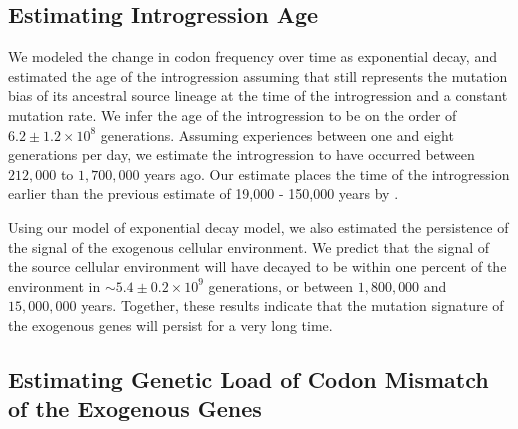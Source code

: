 \documentclass[fleqn,letterpaper]{article}
\begin{document}
\subsection*{Estimating Introgression Age}

We modeled the change in codon frequency over time as exponential decay, and estimated the age of the introgression assuming that \gossypii still represents the mutation bias of its ancestral source lineage at the time of the introgression and a constant mutation rate.
We infer the age of the introgression to be on the order of $6.2\pm1.2\times 10^8$ generations. 
Assuming \kluyveri experiences between one and eight generations per day, we estimate the introgression to have occurred between $212,000$ to $1,700,000$ years ago.
Our estimate places the time of the introgression earlier than the previous estimate of 19,000 - 150,000 years by \citet{friedrich2015}.

Using our model of exponential decay model, we also estimated the persistence of the signal of the exogenous cellular environment.
We predict that the \DM signal of the source cellular environment will have decayed to be within one percent of the \kluyveri environment in $\sim 5.4\pm0.2\times 10^9 $ generations, or between $1,800,000$ and $15,000,000$ years.
Together, these results indicate that the mutation signature of the exogenous genes will persist for a very long time.

\subsection*{Estimating Genetic Load of Codon Mismatch of the Exogenous Genes}
\end{document}
